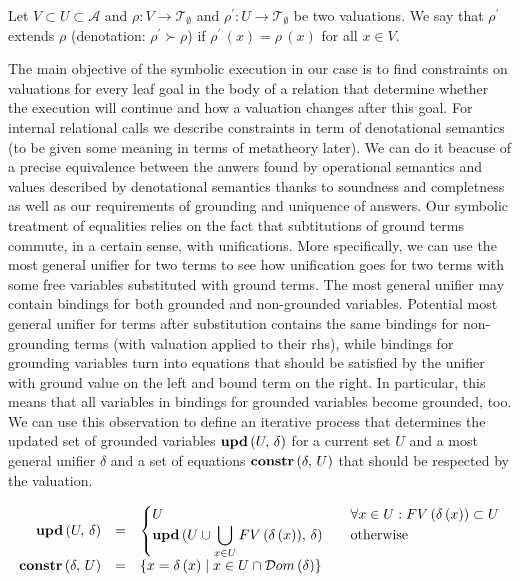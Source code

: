\begin{definition}
  Let $ V \subset U \subset \mathcal{A} $ and $ \rho \colon V \to \mathcal{T}_{\emptyset} $ and $ \rho^\prime \colon U \to \mathcal{T}_{\emptyset} $ be two valuations. We say that $\rho^\prime$ extends $\rho$ (denotation: $ \rho^\prime \succ \rho$) if $\rho^\prime\,(x) = \rho\,(x)$ for all $x \in V$.
\end{definition}

The main objective of the symbolic execution in our case is to find constraints on valuations for every leaf goal in the body of a relation that determine
whether the execution will continue and how a valuation changes after this goal. For internal relational calls we describe constraints in term of denotational
semantics (to be given some meaning in terms of metatheory later). We can do it beacuse of a precise equivalence between the anwers found by operational semantics
and values described by denotational semantics thanks to soundness and completness as well as our requirements of grounding and uniquence of answers.
Our symbolic treatment of equalities relies on the fact that subtitutions of ground terms commute, in a certain sense, with unifications. More specifically,
we can use the most general unifier for two terms to see how unification goes for two terms with some free variables substituted with ground terms.
The most general unifier may contain bindings for both grounded and non-grounded variables. Potential most general unifier for terms after substitution
contains the same bindings for non-grounding terms (with valuation applied to their rhs), while bindings for grounding variables turn into equations that
should be satisfied by the unifier with ground value on the left and bound term on the right. In particular, this means that all variables in bindings for
grounded variables become grounded, too. We can use this observation to define an iterative process that determines the updated set of grounded
variables $\mbox{\textbf{upd}}\,(U,\, \delta)$ for a current set $U$ and a most general unifier $\delta$ and a set of equations $\mbox{\textbf{constr}}\,(\delta,\, U)$ that should be
respected by the valuation.

\[
\begin{array}{rcl}
\mbox{\textbf{upd}}\,(U,\, \delta) &=& \begin{cases}
                           U & \quad\forall x \in U : FV\,(\delta\,(x)) \subset U \\
                           \mbox{\textbf{upd}}\,(U \cup \displaystyle\bigcup\limits_{x \in U} FV\,(\delta\,(x)),\, \delta) & \quad\mbox{otherwise}
                          \end{cases}\\
\mbox{\textbf{constr}}\,(\delta,\, U) &=& \{ x = \delta\,(x) \mid x \in U \cap \mathcal{D}om\,(\delta) \}
\end{array}
\]

